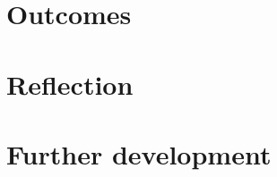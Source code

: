 \section{Outcomes}
\label{chapter3-outcomes}



\section{Reflection}
\label{chapter3-reflection}

\section{Further development}
\label{chapter3-further-development}




